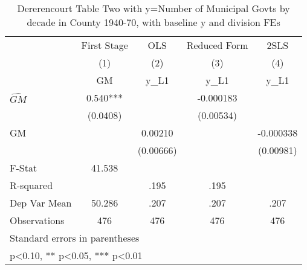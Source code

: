 \begin{table}[htbp]\centering
\def\sym#1{\ifmmode^{#1}\else\(^{#1}\)\fi}
\caption{Dererencourt Table Two with y=Number of Municipal Govts by decade in County 1940-70, with baseline y and division FEs}
\begin{tabular}{l*{4}{c}}
\toprule
                    & First Stage   &         OLS   &Reduced Form   &        2SLS   \\
                    &\multicolumn{1}{c}{(1)}&\multicolumn{1}{c}{(2)}&\multicolumn{1}{c}{(3)}&\multicolumn{1}{c}{(4)}\\
                    &\multicolumn{1}{c}{GM}&\multicolumn{1}{c}{y\_L1}&\multicolumn{1}{c}{y\_L1}&\multicolumn{1}{c}{y\_L1}\\
\midrule
$\hat{GM}$          &       0.540***&               &   -0.000183   &               \\
                    &    (0.0408)   &               &   (0.00534)   &               \\
\addlinespace
GM                  &               &     0.00210   &               &   -0.000338   \\
                    &               &   (0.00666)   &               &   (0.00981)   \\
\midrule
F-Stat              &      41.538   &               &               &               \\
R-squared           &               &        .195   &        .195   &               \\
Dep Var Mean        &      50.286   &        .207   &        .207   &        .207   \\
Observations        &         476   &         476   &         476   &         476   \\
\bottomrule
\multicolumn{5}{l}{\footnotesize Standard errors in parentheses}\\
\multicolumn{5}{l}{\footnotesize * p<0.10, ** p<0.05, *** p<0.01}\\
\end{tabular}
\end{table}
